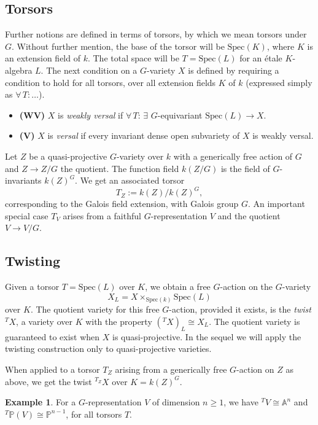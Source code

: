 \documentclass[12pt, reqno]{amsart}
\numberwithin{equation}{section}
\theoremstyle{plain}
\theoremstyle{definition}
\newtheorem{exam}[prop]{Example}
\def\bA{{\mathbb A}}
\def\bP{{\mathbb P}}
\def\Spec{\mathrm{Spec}}
\begin{document}
\subsection*{Torsors}
Further notions are defined in terms of torsors, by which we mean torsors under $G$.
Without further mention, the base of the torsor will be $\Spec(K)$, where $K$ is an extension field of $k$.
The total space will be $T=\Spec(L)$ for an \'etale $K$-algebra $L$.
The next condition on a $G$-variety $X$ is defined by requiring a condition to hold for all torsors, over all extension fields $K$ of $k$ (expressed simply as $\forall\,T\colon\dots$).
\begin{itemize}
\item \textbf{(WV)} $X$ is \emph{weakly versal} if $\forall\,T$: $\exists$ $G$-equivariant $\Spec(L)\to X$.
\item \textbf{(V)} $X$ is \emph{versal} if every invariant dense open subvariety of $X$ is weakly versal.
\end{itemize}

Let $Z$ be a quasi-projective $G$-variety over $k$ with a generically free action of $G$ and $Z\to Z/G$ the quotient.
The function field $k(Z/G)$ is the field of $G$-invariants $k(Z)^G$.
We get an associated torsor
\[ T_Z:=k(Z)/k(Z)^G, \]
corresponding to the Galois field extension,
with Galois group $G$.
An important special case $T_V$ arises from a faithful $G$-representation $V$ and the quotient $V\to V/G$. 



\subsection*{Twisting}
Given a torsor $T=\Spec(L)$ over $K$, we obtain a free $G$-action on the $G$-variety $$
X_L=X\times_{\Spec(k)}\Spec(L)
$$ 
over $K$.
The quotient variety for this free $G$-action, provided it exists, is the \emph{twist} ${}^TX$,
a variety over $K$ with the property
$({}^TX)_L\cong X_L$.
The quotient variety is guaranteed to exist when $X$ is quasi-projective.
In the sequel we will apply the twisting construction only to quasi-projective varieties.

When applied to a torsor $T_Z$ arising from a generically free 
$G$-action on $Z$ as above, we get the twist ${}^{T_Z}X$ over $K=k(Z)^G$.

\begin{exam}
\label{exa.Vtwist}
For a $G$-representation $V$ of dimension $n\ge 1$, we have
${}^TV\cong \bA^n$ \cite[Lemma 3.1]{DR} and
${}^T\bP(V)\cong \bP^{n-1}$, for all torsors $T$.
\end{exam}
\end{document}
